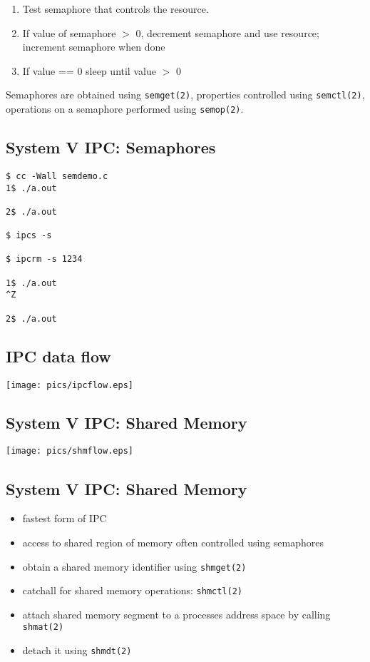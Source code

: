 \documentclass[xga]{xdvislides}
\begin{document}
\begin{enumerate}
	\item Test semaphore that controls the resource.
	\item If value of semaphore $>$ 0, decrement semaphore and use resource;
		increment semaphore when done
	\item If value == 0 sleep until value $>$ 0
\end{enumerate}
\vspace{.5in}
Semaphores are obtained using {\tt semget(2)}, properties controlled using
{\tt semctl(2)}, operations on a semaphore performed using {\tt semop(2)}.

\subsection{System V IPC: Semaphores}
\begin{verbatim}
$ cc -Wall semdemo.c
1$ ./a.out

2$ ./a.out

$ ipcs -s

$ ipcrm -s 1234

1$ ./a.out
^Z

2$ ./a.out

\end{verbatim}

\subsection{IPC data flow}
\begin{center}
	\texttt{[image: pics/ipcflow.eps]}
\end{center}

\subsection{System V IPC: Shared Memory}

\begin{center}
	\texttt{[image: pics/shmflow.eps]}
\end{center}



\subsection{System V IPC: Shared Memory}
\begin{itemize}
	\item fastest form of IPC
	\item access to shared region of memory often controlled using
		semaphores
	\item obtain a shared memory identifier using {\tt shmget(2)}
	\item catchall for shared memory operations: {\tt shmctl(2)}
	\item attach shared memory segment to a processes address space by
		calling {\tt shmat(2)}
	\item detach it using {\tt shmdt(2)}
\end{itemize}
\end{document}
